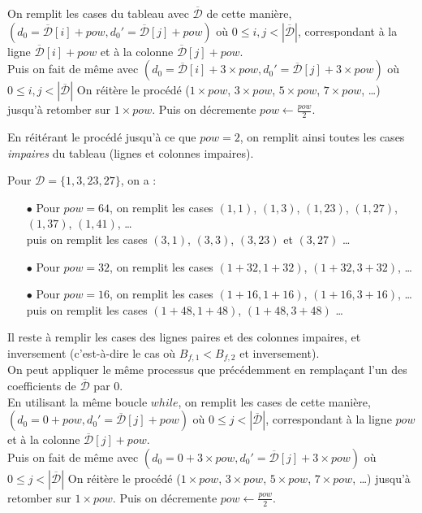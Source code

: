 \documentclass[12pt, a4paper]{memoir}
\newcommand{\dbarre}{\overline{\mathcal{D}}}
\begin{document}
      On remplit les cases du tableau avec $\dbarre$ de cette manière, \\
      $(d_0 = \dbarre[i] + pow,d_0' = \dbarre[j] + pow)$ où $0 \leq i,j < |\dbarre|$, 
      correspondant à la ligne $\dbarre[i] + pow$ et à la colonne $\dbarre[j] + pow$. \\
      Puis on fait de même avec $(d_0 = \dbarre[i] + 3 \times pow,d_0' = \dbarre[j] + 3 \times pow)$ où $0 \leq i,j < |\dbarre|$
      On réitère le procédé ($1 \times pow$, $3 \times pow$, $5 \times pow$, $7 \times pow$, \ldots)
      jusqu'à retomber sur $1 \times pow$. Puis on décremente $pow \leftarrow \frac{pow}{2}$.

      En réitérant le procédé jusqu'à ce que $pow = 2$, on remplit ainsi toutes les cases \emph{impaires} du tableau (lignes et colonnes impaires).

      \begin{Exemple}
       Pour $\mathcal{D} = \{1,3,23,27\}$, on a : 
       \begin{itemize}
        \item [$\bullet$] Pour $pow = 64$, on remplit les cases $(1,1)$, $(1,3)$, $(1,23)$, $(1,27)$, $(1,37)$, $(1,41)$, \ldots \\
       puis on remplit les cases $(3,1)$, $(3,3)$, $(3,23)$ et $(3,27)$ \ldots
        \item [$\bullet$] Pour $pow = 32$, on remplit les cases $(1+32,1+32)$, $(1+32,3+32)$, \ldots
        \item [$\bullet$] Pour $pow = 16$, on remplit les cases $(1+16,1+16)$, $(1+16,3+16)$, \ldots
        puis on remplit les cases $(1+48,1+48)$, $(1+48,3+48)$ \ldots
       \end{itemize}
      \end{Exemple}
    
      Il reste à remplir les cases des lignes paires et des colonnes impaires, et inversement (c'est-à-dire le cas où $B_{f,1} < B_{f,2}$ et inversement). \\
      On peut appliquer le même processus que précédemment en remplaçant l'un des coefficients de $\dbarre$ par $0$. \\
      En utilisant la même boucle $while$, on remplit les cases de cette manière, \\
      $(d_0 = 0 + pow,d_0' = \dbarre[j] + pow)$ où $0 \leq j < |\dbarre|$, 
      correspondant à la ligne $pow$ et à la colonne $\dbarre[j] + pow$. \\
      Puis on fait de même avec $(d_0 = 0 + 3 \times pow,d_0' = \dbarre[j] + 3 \times pow)$ où $0 \leq j < |\dbarre|$
      On réitère le procédé ($1 \times pow$, $3 \times pow$, $5 \times pow$, $7 \times pow$, \ldots)
      jusqu'à retomber sur $1 \times pow$. Puis on décremente $pow \leftarrow \frac{pow}{2}$.
      
\end{document}
